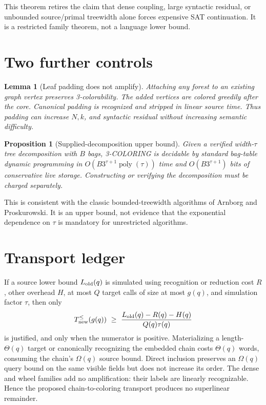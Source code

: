 \documentclass[11pt]{article}
\newtheorem{lemma}{Lemma}
\newtheorem{proposition}{Proposition}
\begin{document}
This theorem retires the claim that dense coupling, large syntactic residual,
or unbounded source/primal treewidth alone forces expensive SAT continuation.
It is a restricted family theorem, not a language lower bound.

\section{Two further controls}
\begin{lemma}[Leaf padding does not amplify]
Attaching any forest to an existing graph vertex preserves 3-colorability.
The added vertices are colored greedily after the core.  Canonical padding is
recognized and stripped in linear source time.  Thus padding can increase
$N,k$, and syntactic residual without increasing semantic difficulty.
\end{lemma}

\begin{proposition}[Supplied-decomposition upper bound]
Given a verified width-$\tau$ tree decomposition with $B$ bags, 3-COLORING is
decidable by standard bag-table dynamic programming in
$O(B3^{\tau+1}\operatorname{poly}(\tau))$ time and
$O(B3^{\tau+1})$ bits of conservative live storage.  Constructing or verifying
the decomposition must be charged separately.
\end{proposition}
This is consistent with the classic bounded-treewidth algorithms of Arnborg
and Proskurowski.  It is an upper bound, not evidence that the exponential
dependence on $\tau$ is mandatory for unrestricted algorithms.

\section{Transport ledger}
If a source lower bound $L_{\rm old}(q)$ is simulated using recognition or
reduction cost $R$, other overhead $H$, at most $Q$ target calls of size at
most $g(q)$, and simulation factor $\tau$, then only
\[
 T_{\rm new}^{\le}(g(q))\ \ge\
 \frac{L_{\rm old}(q)-R(q)-H(q)}{Q(q)\tau(q)}
\]
is justified, and only when the numerator is positive.  Materializing a
length-$\Theta(q)$ target or canonically recognizing the embedded chain costs
$\Theta(q)$ words, consuming the chain's $\Omega(q)$ source bound.  Direct
inclusion preserves an $\Omega(q)$ query bound on the same visible fields but
does not increase its order.  The dense and wheel families add no amplification:
their labels are linearly recognizable.  Hence the proposed chain-to-coloring
transport produces no superlinear remainder.
\end{document}

